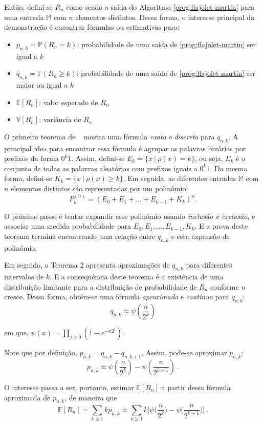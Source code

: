 Então, defini-se $R_n$ como sendo a saída do Algoritmo \ref{prog:flajolet-martin} para uma entrada $\mathbb{M}$
com $n$ elementos distintos. Dessa forma, o interesse principal da demonstração é encontrar fórmulas ou estimativas
para:
\begin{itemize}
  \item $p_{n,k} = \mathbb{P}(R_n = k)$: probabilidade de uma saída de \ref{prog:flajolet-martin} ser igual a $k$
  \item $q_{n,k} = \mathbb{P}(R_n \geq k)$: probabilidade de uma saída de \ref{prog:flajolet-martin} 
  ser maior ou igual a $k$
  \item $\mathbb{E}[R_n]$: valor esperado de $R_n$
  \item $\mathbb{V}[R_n]$: variância de $R_n$
\end{itemize}

O primeiro teorema de ~\citep{flajolet:martin:85} mostra uma fórmula \textit{exata} e \textit{discreta} para $q_{n,k}$. 
A principal idea para encontrar essa fórmula é agrupar as palavras binárias por prefixos da forma $0^k1$.
Assim, defini-se $E_k = \{ x  \ | \ \rho(x) = k \}$, ou seja, $E_k$ é o conjunto de todas as palavras aleatórias com prefixos
iguais a $0^k1$. Da mesma forma, defini-se $K_k = \{ x \ | \ \rho(x) \geq k \}$. Em seguida, as diferentes entradas $\mathbb{M}$
com $n$ elementos distintos são representadas por um polinômio:
\[ P_k^{(n)} = (E_0 + E_1 + \dots + E_{k-1} + K_k)^n .\]

O próximo passo é tentar expandir esse polinômio usando \textit{inclusão e exclusão}, 
e associar uma medida probabilidade para $E_0, E_1, \dots, E_{k-1}, K_k$. E a prova deste teorema termina encontrando uma relação entre $q_{n,k}$
e esta expansão de polinômio.

Em seguida, o Teorema 2 apresenta aproximações de $q_{n,k}$ para diferentes intervalos de $k$.
E a consequência deste teorema é a existência de uma distribuição limitante para a distribuição
de probabilidade de $R_n$ conforme $n$ cresce. Dessa forma, obtém-se uma fórmula \textit{aproximada} e \textit{contínua}
para $q_{n,k}$:
\[ q_{n,k} \approx \psi(\frac{n}{2^k}) \]

em que, $\psi(x) = \prod_{j \geq 0} (1 - e^{-x2^j})$.

Note que por definição, $p_{n,k} = q_{n,k} - q_{n,k+1}$. Assim, pode-se aproximar $p_{n,k}$:
\[ p_{n,k} \approx \psi(\frac{n}{2^k}) - \psi(\frac{n}{2^{k+1}}) \ . \]

O interesse passa a ser, portanto, estimar $\mathbb{E}[R_n]$ a partir dessa fórmula aproximada de $p_{n,k}$,
de maneira que 
\[\mathbb{E}[R_n] = \sum_{k \geq 1} k p_{n,k} \approx \sum_{k \geq 1} k \Big[ \psi \Big( \frac{n}{2^k} \Big) - \psi \Big( \frac{n}{2^{k+1}} \Big) \Big] \ .\]

